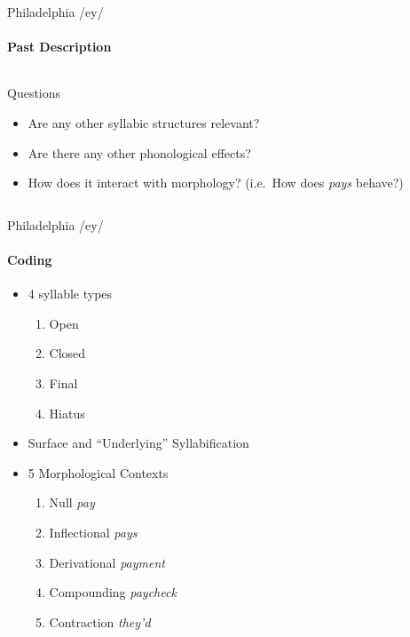 \documentclass[]{beamer}
\begin{document}

\begin{frame}{Philadelphia /ey/}
	\framesubtitle{Past Description}
	
	\begin{columns}[c]
		
		
			\begin{block}{Questions}
				\begin{itemize}
					\item Are any other syllabic structures relevant?
					\item Are there any other phonological effects?
					\item How does it interact with morphology? (i.e.\ How does {\it pays} behave?)
				\end{itemize}
			\end{block}
	\end{columns}
\end{frame}




\begin{frame}{Philadelphia /ey/}
	\framesubtitle{Coding}
	
			\begin{itemize}
				\item 4 syllable types
					\begin{enumerate}
						\item Open
						\item Closed
						\item Final
						\item Hiatus
					\end{enumerate}
				\item Surface and ``Underlying'' Syllabification
				\item 5 Morphological Contexts
					\begin{enumerate}
						\item Null {\it pay}
						\item Inflectional {\it pays}
						\item Derivational {\it payment}
						\item Compounding  {\it paycheck}
						\item Contraction  {\it they'd}
					\end{enumerate}
			\end{itemize}
\end{frame}
\end{document}
